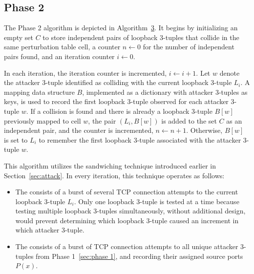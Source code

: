 \documentclass[twocolumn]{report}
\begin{document}
\vspace{0.2cm}


%
% 		
%
% 		

\subsection{Phase 2}
\label{sec:phase 2}

The Phase 2 algorithm is depicted in Algorithm~\hyperref[alg:phase2]{3}. It begins by initializing an empty set $C$ to store \alert{independent pairs of loopback 3-tuples} that collide in the same perturbation table cell, a counter $n \leftarrow 0$ for the \alert{number of independent pairs found}, and an \alert{iteration counter} $i \leftarrow 0$.

In each iteration, the iteration counter is incremented, \(i \leftarrow i+1\). Let \(w\) denote the attacker 3-tuple identified as colliding with the current loopback 3-tuple \(L_i\). A mapping data structure \(B\), implemented as a \alert{dictionary} with attacker 3-tuples as keys, is used to record the first loopback 3-tuple observed for each attacker 3-tuple \(w\). \alert{If a collision is found} and there is already a loopback 3-tuple \(B[w]\) previously mapped to cell \(w\), the pair \((L_i, B[w])\) is added to the set \(C\) as an independent pair, and the counter is incremented, \(n \leftarrow n+1\). \alert{Otherwise}, \(B[w]\) is set to \(L_i\) to remember the first loopback 3-tuple associated with the attacker 3-tuple \(w\).

This algorithm utilizes the sandwiching technique introduced earlier in Section~\ref{sec:attack}. In every iteration, this technique operates as follows:
\begin{itemize}
  \item The  consists of a burst of several TCP connection attempts to the current loopback 3-tuple $L_i$. Only one loopback 3-tuple is tested at a time because testing multiple loopback 3-tuples simultaneously, without additional design, would prevent determining which loopback 3-tuple caused an increment in which attacker 3-tuple.
  \item The  consists of a burst of TCP connection attempts to all unique attacker 3-tuples from Phase 1~\ref{sec:phase 1}, and recording their assigned source ports $P(x)$.
\end{itemize}
\end{document}
